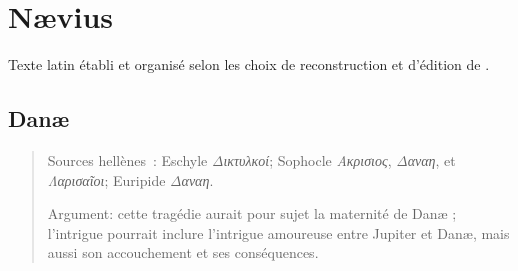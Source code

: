 \documentclass[12pt,onecolumn,twoside,a4paper]{memoir}
\begin{document}
         
         
            \section{Nævius}
            Texte latin établi et organisé selon les choix de reconstruction et d'édition de \cite{SpaltenNaevius}.\par
            
               \subsection*{Danæ}
               \begin{abstract}
                  Sources hellènes : Eschyle \textit{Δικτυλκοί}; Sophocle
                        \textit{Ακρισιος}, \textit{Δαναη},
                     et \textit{Λαρισαῖοι}; Euripide \textit{Δαναη}.\par
                  Argument: cette tragédie aurait pour sujet la maternité de Danæ ; l’intrigue
                     pourrait inclure l’intrigue amoureuse entre Jupiter et Danæ, mais aussi son
                     accouchement et ses conséquences.\par
               \end{abstract}
\end{document}
